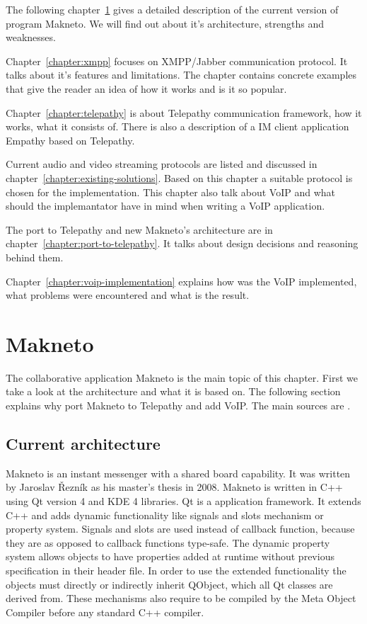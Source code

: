 The following chapter~\ref{chapter:makneto} gives a detailed description of the current version of program Makneto. We will find out about it's architecture, strengths and weaknesses. 

Chapter~\ref{chapter:xmpp} focuses on XMPP/Jabber communication protocol. It talks about it's features and limitations. The chapter contains concrete examples that give the reader an idea of how it works and is it so popular.

Chapter~\ref{chapter:telepathy} is about Telepathy communication framework, how it works, what it consists of. There is also a description of a IM client application Empathy based on Telepathy. 

Current audio and video streaming protocols are listed and discussed in chapter~\ref{chapter:existing-solutions}. Based on this chapter a suitable protocol is chosen for the implementation. This chapter also talk about VoIP and what should the implemantator have in mind when writing a VoIP application.

The port to Telepathy and new Makneto's architecture are in chapter~\ref{chapter:port-to-telepathy}. It talks about design decisions and reasoning behind them. 

Chapter~\ref{chapter:voip-implementation} explains how was the VoIP implemented, what problems were encountered and what is the result.  


\chapter{Makneto}\label{chapter:makneto}
The collaborative application Makneto is the main topic of this chapter. First we take a look at the architecture and what it is based on. The following section explains why port Makneto to Telepathy and add VoIP. The main sources are \cite{makneto,qtBook,SVGtiny}. 
   
\section{Current architecture}
Makneto is an instant messenger with a shared board capability. It was written by Jaroslav Řezník as his master's thesis in 2008. Makneto is written in C++ using Qt version 4 and KDE 4 libraries. Qt is a application framework. It extends C++ and adds dynamic functionality like signals and slots mechanism or property system. Signals and slots are used instead of callback function, because they are as opposed to callback functions type-safe. The dynamic property system allows objects to have properties added at runtime without previous specification in their header file. In order to use the extended functionality the objects must directly or indirectly inherit QObject, which all Qt classes are derived from. These mechanisms also require to be compiled by the Meta Object Compiler before any standard C++ compiler.

